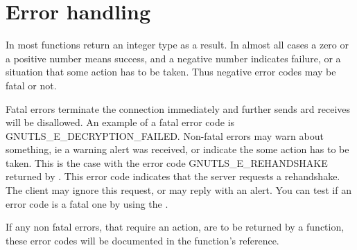 \section{Error handling}
\par
In \gnutls{} most functions return an integer type as a result.
In almost all cases a zero or a positive number means success, and
a negative number indicates failure, or a situation that some
action has to be taken. Thus negative error codes may be fatal
or not. 
\par 
Fatal errors terminate the connection immediately and
further sends ard receives will be disallowed. An example of
a fatal error code is GNUTLS\_E\_DECRYPTION\_FAILED. Non-fatal errors
may warn about something, ie a warning alert was received, or
indicate the some action has to be taken. This is the case with
the error code GNUTLS\_E\_REHANDSHAKE returned by 
.
This error code indicates that the server requests a rehandshake. The client
may ignore this request, or may reply with an alert.
You can test if an error code is a fatal one by using the
.
\par
If any non fatal errors, that require an action, are to be returned by a
function, these error codes will be documented
in the function's reference.

